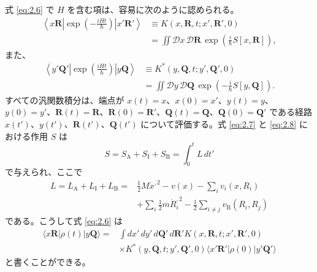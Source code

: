 式 \eqref{eq:2.6} で $H$ を含む項は、容易に次のように認められる\cite{ref22}。
\begin{equation}
 \begin{aligned}
 \left\langle x\bm R\left|\exp\left(-\frac{iHt}{\hbar}\right)\right|x'\bm R'\right\rangle
 &\equiv K(x,\bm R,t;x',\bm R',0)\\
 &=\iint\mathcal D x\,\mathcal D\bm R\,
 \exp\left(\frac{i}{\hbar}S[x,\bm R]\right),
 \end{aligned}
 \tag{2.7}\label{eq:2.7}
\end{equation}
また、
\begin{equation}
 \begin{aligned}
 \left\langle y'\bm Q'\left|\exp\left(\frac{iHt}{\hbar}\right)\right|y\bm Q\right\rangle
 &\equiv K^*(y,\bm Q,t;y',\bm Q',0)\\
 &=\iint\mathcal D y\,\mathcal D\bm Q\,
 \exp\left(-\frac{i}{\hbar}S[y,\bm Q]\right).
 \end{aligned}
 \tag{2.8}\label{eq:2.8}
\end{equation}
すべての汎関数積分は、端点が $x(t)=x$、$x(0)=x'$、$y(t)=y$、$y(0)=y'$、$\bm R(t)=\bm R$、$\bm R(0)=\bm R'$、$\bm Q(t)=\bm Q$、$\bm Q(0)=\bm Q'$ である経路 $x(t')$、$y(t')$、$\bm R(t')$、$\bm Q(t')$ について評価する。式 \eqref{eq:2.7} と \eqref{eq:2.8} における作用 $S$ は
\begin{equation}
 S=S_{\mathrm A}+S_{\mathrm I}+S_{\mathrm B}=\int_0^t L\,dt'
 \tag{2.9}\label{eq:2.9}
\end{equation}
で与えられ、ここで
\begin{equation}
 \begin{aligned}
 L=L_{\mathrm A}+L_{\mathrm I}+L_{\mathrm B}
 ={}&\frac12 M\dot{x}^{,2}-v(x)-\sum_i v_i(x,R_i)\\
 &+\sum_i\frac12m\dot R_i^{,2}-\frac12\sum_{i\ne j}v_{\mathrm B}(R_i,R_j)
 \end{aligned}
 \tag{2.10}\label{eq:2.10}
\end{equation}
である。こうして式 \eqref{eq:2.6} は
\begin{equation}
 \begin{aligned}
 \langle x\bm R|\rho(t)|y\bm Q\rangle
 ={}&\int dx'\,dy'\,d\bm Q'\,d\bm R'
 K(x,\bm R,t;x',\bm R',0)\\
 &\times K^*(y,\bm Q,t;y',\bm Q',0)
 \langle x'\bm R'|\rho(0)|y'\bm Q'\rangle
 \end{aligned}
 \tag{2.11}\label{eq:2.11}
\end{equation}
と書くことができる。

